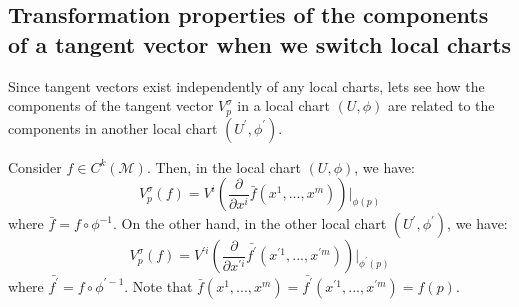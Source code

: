     \subsection{Transformation properties of the components of a tangent
    vector when we switch local charts}
      Since tangent vectors exist independently of any local charts, lets
      see how the components of the tangent vector $V^\sigma_p$ in a local
      chart $(U,\phi)$ are related to the components in another local chart
      $(U^\prime, \phi^\prime)$.

      Consider $f\in C^k(\mathcal{M})$. Then, in the local chart
      $(U,\phi)$, we have:
      \begin{equation*}
        V^\sigma_p(f) = V^i \left(\frac{\partial}{\partial x^i}
        \bar{f}(x^1,...,x^m)\right)\Bigr|_{\phi(p)}
      \end{equation*}
      where $\bar{f} = f \circ \phi^{-1}$.
      On the other hand, in the other local chart $(U^\prime,\phi^\prime)$,
      we have:
      \begin{equation*}
        V^\sigma_p(f) = V^{\prime i} \left(\frac{\partial }{\partial x^{\prime
        i}}\bar{f^\prime}(x^{\prime 1},...,x^{\prime m})\right)\Bigr|_{\phi^\prime(p)}
      \end{equation*}
      where $\bar{f^\prime} = f \circ \phi^{\prime-1}$.
      Note that $\bar{f}(x^1,...,x^m) = \bar{f^\prime}(x^{\prime
      1},...,x^{\prime m}) = f(p)$.

